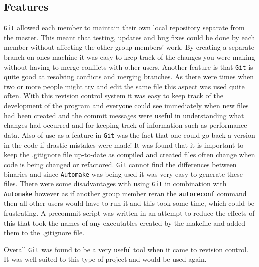 \subsection{Features}
\texttt{Git} allowed each member to maintain their own local repository separate from the master.
This meant that testing, updates and bug fixes could be done by each member without affecting the other group members' work.
By creating a separate branch on ones machine it was easy to keep track of the changes you were making without having to merge conflicts with other users.
Another feature is that \texttt{Git} is quite good at resolving conflicts and merging branches.
As there were times when two or more people might try and edit the same file this aspect was used quite often.
With this revision control system it was easy to keep track of the development of the program and everyone could see immediately when new files had been created and the commit messages were useful in understanding what changes had occurred and for keeping track of information such as performance data.
Also of use as a feature in \texttt{Git} was the fact that one could go back a version in the code if drastic mistakes were made!
It was found that it is important to keep the .gitignore file up-to-date as compiled and created files often change when code is being changed or refactored.
\texttt{Git} cannot find the differences between binaries and since \texttt{Automake} was being used it was very easy to generate these files.
There were some disadvantages with using \texttt{Git} in combination with \texttt{Automake} however as if another group member reran the \texttt{autoreconf} command then all other users would have to run it and this took some time, which could be frustrating.
A precommit script was written in an attempt to reduce the effects of this that took the names of any executables created by the makefile and added them to the .gitignore file.

Overall \texttt{Git} was found to be a very useful tool when it came to revision control.
It was well suited to this type of project and would be used again.
